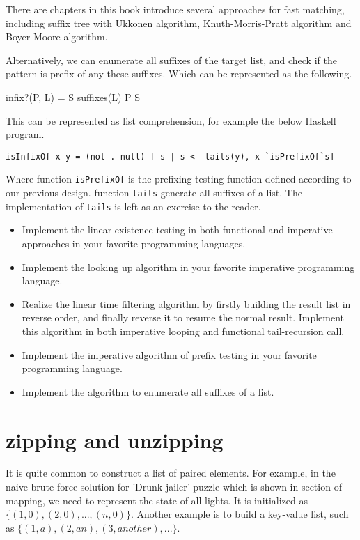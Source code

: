 \documentclass[UTF8]{article}
\begin{document}
There are chapters in this book introduce several approaches for fast matching, including
suffix tree with Ukkonen algorithm, Knuth-Morris-Pratt algorithm and Boyer-Moore algorithm.

Alternatively, we can enumerate all suffixes of the target list, and check if the pattern
is prefix of any these suffixes. Which can be represented as the following.

\be
infix?(P, L) = \exists S \in suffixes(L) \land P \subseteq S
\ee

This can be represented as list comprehension, for example the below Haskell program.

\lstset{language=Haskell}
\begin{lstlisting}
isInfixOf x y = (not . null) [ s | s <- tails(y), x `isPrefixOf`s]
\end{lstlisting}

Where function \verb|isPrefixOf| is the prefixing testing function defined according to
our previous design. function \verb|tails| generate all suffixes of a list. The implementation
of \verb|tails| is left as an exercise to the reader.

\begin{Exercise}
\begin{itemize}
\item Implement the linear existence testing in both functional and imperative approaches in
your favorite programming languages.
\item Implement the looking up algorithm in your favorite imperative programming language.
\item Realize the linear time filtering algorithm by firstly building the result list in reverse
order, and finally reverse it to resume the normal result. Implement this algorithm in both
imperative looping and functional tail-recursion call.
\item Implement the imperative algorithm of prefix testing in your favorite programming language.
\item Implement the algorithm to enumerate all suffixes of a list.
\end{itemize}
\end{Exercise}

\section{zipping and unzipping}

It is quite common to construct a list of paired elements. For example, in the naive
brute-force solution for 'Drunk jailer' puzzle which is shown in section of mapping,
we need to represent the state of all lights. It is initialized as $\{(1, 0), (2, 0), ..., (n, 0)\}$.
Another example is to build a key-value list, such as $\{(1, a), (2, an), (3, another), ... \}$.
\end{document}
